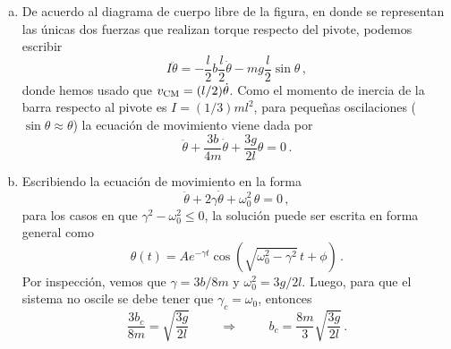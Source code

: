 \begin{enumerate}[a)]
	\item \begin{figure}[tbph]
		\centering
	\end{figure}
	
	De acuerdo al diagrama de cuerpo libre de la figura, en donde se representan las \'unicas dos fuerzas que realizan torque respecto del pivote, podemos escribir
	\begin{equation*}
		I \ddot{\theta} = -\frac{l}{2}b\frac{l}{2} \dot{\theta} -mg\frac{l}{2} \sin \theta\,,
	\end{equation*}
	donde hemos usado que $v_{\scriptsize{\text{CM}}}=(l/2) \dot{\theta}$. Como el momento de inercia de la barra respecto al pivote es $I=(1/3)ml^{2}$, para peque\~nas oscilaciones ($\sin \theta \approx \theta$) la ecuación de movimiento viene dada por
	\begin{equation*}\label{ecmovfinal}
		\ddot{\theta} + \frac{3b}{4m} \dot{\theta} + \frac{3g}{2l}\theta=0\,.
	\end{equation*}

	\item Escribiendo la ecuación de movimiento en la forma 
	\begin{equation*}\label{ecmovgeneral}
		\ddot{\theta} + 2\gamma \dot{\theta} + \omega_{0}^{2}\,\theta=0\,,
	\end{equation*}
	para los casos en que $\gamma^2-\omega_{0}^{2}\leq 0$, la soluci\'on puede ser escrita en forma general como
	\begin{equation*}
		\theta(t)=Ae^{-\gamma t}\cos\left(\sqrt{\omega_{0}^{2}-\gamma^{2}}\,t+\phi\right)\,.
	\end{equation*}
	Por inspecci\'on, vemos que $\gamma=3b/8m$ y $\omega_{0}^{2}=3g/2l$. Luego, para que el sistema no oscile se debe tener que $\gamma_{c}=\omega_{0}$, entonces
	\begin{equation*}
		\frac{3b_{c}}{8m}=\sqrt{\frac{3g}{2l}}\hspace{1cm}\Rightarrow\hspace{1cm}b_{c}=\frac{8m}{3}\sqrt{\frac{3g}{2l}}\,.
	\end{equation*}


\end{enumerate}
